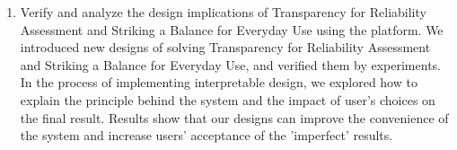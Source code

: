 \documentclass[type=master]{fduthesis}
\begin{document}
\begin{abstract*}
\begin{enumerate}
    \item Verify and analyze the design implications of Transparency for Reliability Assessment and Striking a Balance for Everyday Use using the platform.
We introduced new designs of solving Transparency for Reliability Assessment and Striking a Balance for Everyday Use, and verified them by experiments.
In the process of implementing interpretable design, we explored how to explain the principle behind the system and the impact of user's choices on the final result.
Results show that our designs can improve the convenience of the system and increase users' acceptance of the 'imperfect' results.

  \end{enumerate}
\end{abstract*}


\mainmatter







\backmatter





\end{document}
